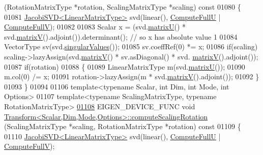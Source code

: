 \begin{DoxyCode}
      (RotationMatrixType *rotation, ScalingMatrixType *scaling)\textcolor{keyword}{ const}
01080 \textcolor{keyword}{}\{
01081   \hyperlink{group___s_v_d___module_class_eigen_1_1_jacobi_s_v_d}{JacobiSVD<LinearMatrixType>} svd(linear(), 
      \hyperlink{group__enums_ggae3e239fb70022eb8747994cf5d68b4a9a2b4f91ca5859a4159dbfe8090043817f}{ComputeFullU} | \hyperlink{group__enums_ggae3e239fb70022eb8747994cf5d68b4a9a52c6f7e80bbf9a42297c88f700245b51}{ComputeFullV});
01082 
01083   Scalar x = (svd.\hyperlink{group___s_v_d___module_afc7fe1546b0f6e1801b86f22f5664cb8}{matrixU}() * svd.\hyperlink{group___s_v_d___module_a245a453b5e7347f737295c23133238c4}{matrixV}().adjoint()).determinant(); \textcolor{comment}{// so x has absolute
       value 1}
01084   VectorType sv(svd.\hyperlink{group___s_v_d___module_a4e7bac123570c348f7ed6be909e1e474}{singularValues}());
01085   sv.coeffRef(0) *= x;
01086   \textcolor{keywordflow}{if}(scaling) scaling->lazyAssign(svd.\hyperlink{group___s_v_d___module_a245a453b5e7347f737295c23133238c4}{matrixV}() * sv.asDiagonal() * svd.
      \hyperlink{group___s_v_d___module_a245a453b5e7347f737295c23133238c4}{matrixV}().adjoint());
01087   \textcolor{keywordflow}{if}(rotation)
01088   \{
01089     LinearMatrixType m(svd.\hyperlink{group___s_v_d___module_afc7fe1546b0f6e1801b86f22f5664cb8}{matrixU}());
01090     m.col(0) /= x;
01091     rotation->lazyAssign(m * svd.\hyperlink{group___s_v_d___module_a245a453b5e7347f737295c23133238c4}{matrixV}().adjoint());
01092   \}
01093 \}
01094 
01106 \textcolor{keyword}{template}<\textcolor{keyword}{typename} Scalar, \textcolor{keywordtype}{int} Dim, \textcolor{keywordtype}{int} Mode, \textcolor{keywordtype}{int} Options>
01107 \textcolor{keyword}{template}<\textcolor{keyword}{typename} ScalingMatrixType, \textcolor{keyword}{typename} RotationMatrixType>
\hyperlink{group___geometry___module_a88f214d6340a4ced22d673d54661e16c}{01108} EIGEN\_DEVICE\_FUNC \textcolor{keywordtype}{void} 
      \hyperlink{group___geometry___module_a88f214d6340a4ced22d673d54661e16c}{Transform<Scalar,Dim,Mode,Options>::computeScalingRotation}
      (ScalingMatrixType *scaling, RotationMatrixType *rotation)\textcolor{keyword}{ const}
01109 \textcolor{keyword}{}\{
01110   \hyperlink{group___s_v_d___module_class_eigen_1_1_jacobi_s_v_d}{JacobiSVD<LinearMatrixType>} svd(linear(), 
      \hyperlink{group__enums_ggae3e239fb70022eb8747994cf5d68b4a9a2b4f91ca5859a4159dbfe8090043817f}{ComputeFullU} | \hyperlink{group__enums_ggae3e239fb70022eb8747994cf5d68b4a9a52c6f7e80bbf9a42297c88f700245b51}{ComputeFullV});

\end{DoxyCode}
